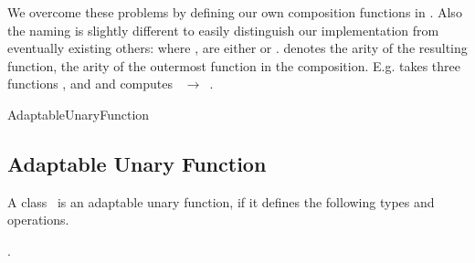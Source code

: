 We overcome these problems by defining our own composition functions
in \cgal. Also the naming is slightly different to easily distinguish
our implementation from eventually existing others:
 where ,  are either 
or .   denotes the arity of the resulting function,
 the arity of the outermost function in the composition.
E.g.  takes three functions ,  and
 and computes ~$\rightarrow$~.

\begin{ccClass}{AdaptableUnaryFunction}
\subsection{Adaptable Unary Function}

\ccThreeToTwo
  
  \ccDefinition A class \ccClassName\ is an adaptable unary function,
  if it defines the following types and operations.

  \ccTypes 
  
  \ccGlue

  \ccCreation

  \ccGlue
  
  \ccOperations
  
  \ccGlue
  
\ccSeeAlso

.

\end{ccClass}


